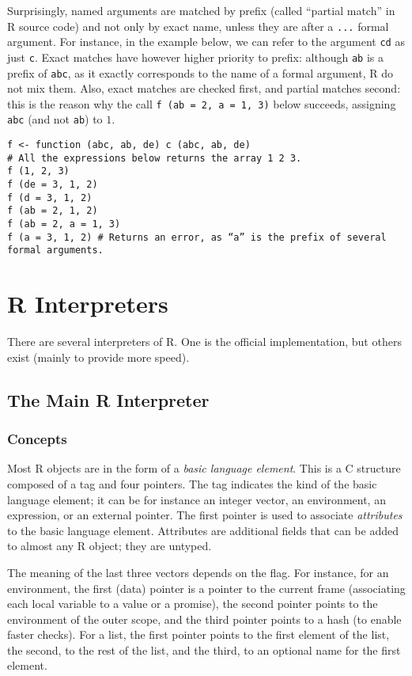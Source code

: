 \documentclass{article}
\newcommand\R{R}
\newcommand\Cn{C}
\begin{document}
Surprisingly, named arguments are matched by prefix
(called “partial match” in \R{} source code) and not only by exact name,
unless they are after a \texttt{...} formal argument.
For instance, in the example below,
we can refer to the argument \texttt{cd} as just \texttt{c}.
Exact matches have however higher priority to prefix:
although \texttt{ab} is a prefix of \texttt{abc},
as it exactly corresponds to the name of a formal argument,
\R{} do not mix them.
Also, exact matches are checked first, and partial matches second:
this is the reason why the call \texttt{f (ab = 2, a = 1, 3)}
below succeeds, assigning \texttt{abc}
(and not \texttt{ab}) to \(1\).
\begin{verbatim}
f <- function (abc, ab, de) c (abc, ab, de)
# All the expressions below returns the array 1 2 3.
f (1, 2, 3)
f (de = 3, 1, 2)
f (d = 3, 1, 2)
f (ab = 2, 1, 2)
f (ab = 2, a = 1, 3)
f (a = 3, 1, 2) # Returns an error, as “a” is the prefix of several formal arguments.
\end{verbatim}


\section{\R{} Interpreters}
\label{sec:interpreters}

There are several interpreters of \R{}.
One is the official implementation,
but others exist (mainly to provide more speed).

\subsection{The Main \R{} Interpreter}
\label{sec:main:interpreter}

\subsubsection{Concepts}
\label{sec:concepts}

Most \R{} objects are in the form of a \emph{basic language element}.
This is a \Cn{} structure composed of a tag and four pointers.
The tag indicates the kind of the basic language element;
it can be for instance an integer vector, an environment, an expression, or an external pointer.
The first pointer is used to associate \emph{attributes} to the basic language element.
Attributes are additional fields that can be added to almost any \R{} object;
they are untyped.

The meaning of the last three vectors depends on the flag.
%
For instance, for an environment, the first (data) pointer is a pointer
to the current frame (associating each local variable to a value or a promise),
the second pointer points to the environment of the outer scope,
and the third pointer points to a hash (to enable faster checks).
%
For a list, the first pointer points to the first element of the list,
the second, to the rest of the list,
and the third, to an optional name for the first element.
\end{document}
